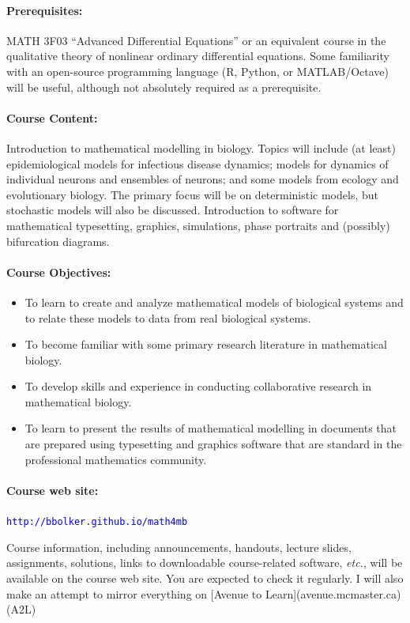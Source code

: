\documentclass[12pt]{article}
\newcommand{\url}[1]{{\tt\textcolor{blue}{#1}}}
\begin{document}
\paragraph*{Prerequisites:} MATH 3F03 ``Advanced Differential Equations'' or an equivalent course in the qualitative theory of nonlinear ordinary differential equations. Some familiarity with an open-source programming language (R, Python, or MATLAB/Octave) will be useful, although not absolutely required as a prerequisite.

\paragraph*{Course Content:}
Introduction to mathematical modelling in biology.  Topics will include (at least) epidemiological models for infectious disease dynamics; models for dynamics of individual neurons and ensembles of neurons; and some models from ecology and evolutionary biology. The primary focus will be on deterministic models, but stochastic models will also be discussed.   Introduction to software for mathematical typesetting, graphics, simulations, phase portraits and (possibly) bifurcation diagrams.

\paragraph*{Course Objectives:}

\begin{itemize}
\item To learn to create and analyze mathematical models of biological systems and to relate these models to data from real biological systems.  
\item To become familiar with some primary research literature in mathematical biology.
\item To develop skills and experience in conducting collaborative research in mathematical biology.
\item To learn to present the results of mathematical modelling in documents that are prepared using typesetting and graphics software that are standard in the professional mathematics community.
\end{itemize}

\paragraph*{Course web site:} \url{http://bbolker.github.io/math4mb}

\noindent
Course information, including announcements, handouts, lecture slides, assignments, solutions, links to downloadable course-related software, {\it etc.\/}, will be available on the course web site.  You are expected to check it regularly. I will also make an attempt to mirror everything on [Avenue to Learn](avenue.mcmaster.ca) (A2L)
\end{document}

